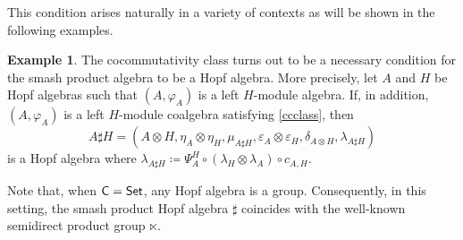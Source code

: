 \documentclass[11pt,reqno]{amsart}
\theoremstyle{plain}%
\theoremstyle{definition}
\newtheorem{example}[theorem]{Example}%
\theoremstyle{remark}
\begin{document}
This condition arises naturally in a variety of contexts as will be shown in the following examples.
\begin{example}\label{smashHA}
	The cocommutativity class turns out to be a necessary condition for the smash product algebra to be a Hopf algebra. More precisely, let $A$ and $H$ be Hopf algebras such that $(A,\varphi_{A})$ is a left $H$-module algebra. If, in addition, $(A,\varphi_{A})$ is a left $H$-module coalgebra satisfying \eqref{ccclass}, then 
	\[A\sharp H=(A\otimes H,\eta_{A}\otimes\eta_{H},\mu_{A\sharp H},\varepsilon_{A}\otimes\varepsilon_{H},\delta_{A\otimes H},\lambda_{A\sharp H})\]
	is a Hopf algebra where $\lambda_{A\sharp H}\coloneqq \Psi^{H}_{A}\circ(\lambda_{H}\otimes\lambda_{A})\circ c_{A,H}.$
	
	Note that, when ${\sf C}={\sf Set}$, any Hopf algebra is a group. Consequently, in this setting, the smash product Hopf algebra $\sharp$ coincides with the well-known semidirect product group $\ltimes$.
\end{example} 
\end{document}
